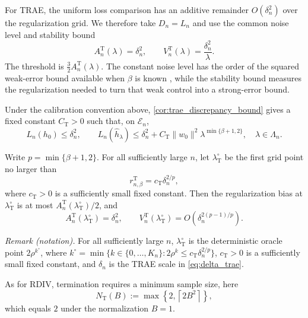 \documentclass[12pt]{article}
\theoremstyle{plain}
\theoremstyle{definition}
\theoremstyle{remark}
\begin{document}
For TRAE, the uniform loss comparison has an additive remainder $O(\delta_n^2)$ over the regularization grid. We therefore take $D_n=L_n$ and use the common noise level and stability bound
\begin{equation}\label{eq:trae_common_scales}
A_n^{\mathrm T}(\lambda)=\delta_n^2,
\qquad
V_n^{\mathrm T}(\lambda)=\frac{\delta_n^2}{\lambda}.
\end{equation}
The threshold is $\tfrac32A_n^{\mathrm T}(\lambda)$. The constant noise level has the order of the squared weak-error bound available when $\beta$ is known \citep{bennett2023source}, while the stability bound measures the regularization needed to turn that weak control into a strong-error bound.

Under the calibration convention above, \cref{cor:trae_discrepancy_bound} gives a fixed constant $C_{\mathrm T}>0$ such that, on $\mathcal E_n$,
\begin{equation}\label{eq:trae_discrepancy_bound}
L_n(h_0)\leqslant\delta_n^2,\qquad
L_n(\hat h_\lambda)
\leqslant\delta_n^2
+C_{\mathrm T}\|w_0\|^2\lambda^{\min\{\beta+1,2\}},
\quad \lambda\in\Lambda_n.
\end{equation}

Write $p=\min\{\beta+1,2\}$. For all sufficiently large $n$, let
$\lambda_{\mathrm T}^\circ$ be the first grid point no larger than
\[
r_{n,\beta}^{\mathrm T}=c_{\mathrm T}\delta_n^{2/p},
\]
where $c_{\mathrm T}>0$ is a sufficiently small fixed constant. Then the regularization bias at $\lambda_{\mathrm T}^\circ$ is at most
$A_n^{\mathrm T}(\lambda_{\mathrm T}^\circ)/2$, and
\begin{equation}\label{eq:trae_oracle_scales}
A_n^{\mathrm T}(\lambda_{\mathrm T}^\circ)
=\delta_n^2,\qquad
V_n^{\mathrm T}(\lambda_{\mathrm T}^\circ)
=O\!\left(\delta_n^{2(p-1)/p}\right).
\end{equation}

\noindent\textit{Remark (notation).} For all sufficiently large $n$, $\lambda_{\mathrm T}^\circ$ is the deterministic oracle point $2\rho^{k^\circ}$, where $k^\circ=\min\{k\in\{0,\ldots,K_n\}:2\rho^k\leqslant c_{\mathrm T}\delta_n^{2/p}\}$, $c_{\mathrm T}>0$ is a sufficiently small fixed constant, and $\delta_n$ is the TRAE scale in \eqref{eq:delta_trae}.


As for RDIV, termination requires a minimum sample size, here
\[
N_{\mathrm T}(B) :=\max\left\{2,\left\lceil 2B^2\right\rceil\right\},
\]
which equals $2$ under the normalization $B=1$.
\end{document}
